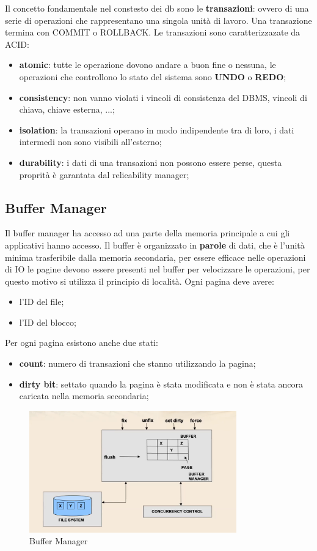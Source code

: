 \documentclass[12pt]{article}
\begin{document}
Il concetto fondamentale nel constesto dei db sono le \textbf{transazioni}: ovvero di una serie di operazioni che rappresentano una singola unit\`a  di lavoro. Una transazione termina con COMMIT o ROLLBACK. Le transazioni sono caratterizzazate da ACID:
\begin{itemize}
    \item \textbf{atomic}: tutte le operazione dovono andare a buon fine o nessuna, le operazioni che controllono lo stato del sistema sono \textbf{UNDO} o \textbf{REDO};
    \item \textbf{consistency}: non vanno violati i vincoli di consistenza del DBMS, vincoli di chiava, chiave esterna, ...;
    \item \textbf{isolation}: la transazioni operano in modo indipendente tra di loro, i dati intermedi non sono visibili all'esterno;
    \item \textbf{durability}: i dati di una transazioni non possono essere perse, questa proprit\`a \`e garantata dal relieability manager;
\end{itemize}


\subsection{Buffer Manager}
Il buffer manager ha accesso ad una parte della memoria principale a cui gli applicativi hanno accesso. Il buffer \`e organizzato in \textbf{parole} di dati, che \`e l'unit\`a minima trasferibile dalla memoria secondaria, per essere efficace nelle operazioni di IO le pagine devono essere presenti nel buffer per velocizzare le operazioni, per questo motivo si utilizza il principio di localit\`a. Ogni pagina deve avere:
\begin{itemize}
    \item l'ID del file;
    \item l'ID del blocco;
\end{itemize}
Per ogni pagina esistono anche due stati:
\begin{itemize}
    \item \textbf{count}: numero di transazioni che stanno utilizzando la pagina;
    \item \textbf{dirty bit}: settato quando la pagina \`e stata modificata e non \`e stata ancora caricata nella memoria secondaria;
\end{itemize}
\begin{figure}[H]
    \centering
    \includegraphics[width=0.8\textwidth]{buffer-manager.png}
    \caption{Buffer Manager}
    \label{fig:buffer-manager}
\end{figure}
\end{document}
